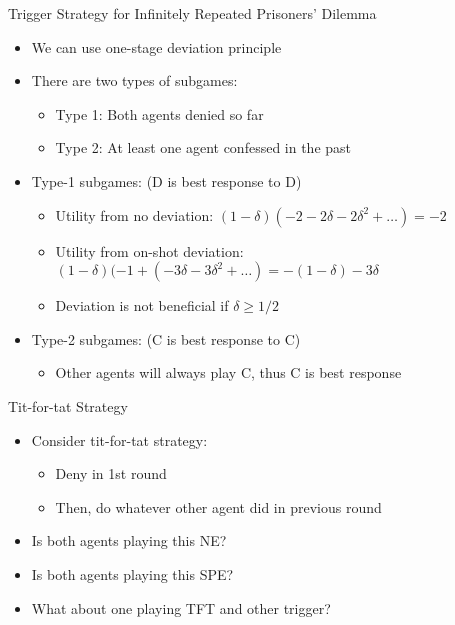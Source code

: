 \documentclass[11pt,aspectratio=169]{beamer}
\begin{document}
  
  \begin{frame}{Trigger Strategy for Infinitely Repeated Prisoners' Dilemma}
   \begin{itemize}[<+->]
   \setlength{\itemsep}{0.7em}
    \item We can use one-stage deviation principle
    \item There are two types of subgames:
    \begin{itemize}[<.->]
     \item Type 1: Both agents denied so far
     \item Type 2: At least one agent confessed in the past
    \end{itemize}
    \item Type-1 subgames: (D is best response to D)
    \begin{itemize}
     \item Utility from no deviation: $(1 - \delta) (-2 - 2\delta - 2\delta^{2} + \dots) = - 2$
     \item Utility from on-shot deviation: $(1 - \delta) (-1 + (-3\delta -3\delta^{2} + \dots) = - (1 - \delta ) - 3\delta$
     \item Deviation is not beneficial if $\delta  \geq  1/2$
    \end{itemize}
    \item Type-2 subgames: (C is best response to C)
    \begin{itemize}
     \item Other agents will always play C, thus C is best response
    \end{itemize}  
   \end{itemize}
  \end{frame}    
    
  \begin{frame}{Tit-for-tat Strategy}
   \begin{itemize}[<+->]
   \setlength{\itemsep}{1.2em}
    \item Consider \alert{tit-for-tat} strategy:
    \begin{itemize}[<.->]
     \item Deny in 1st round
     \item Then, do whatever other agent did in previous round
    \end{itemize}
    \item Is both agents playing this NE?
    \item Is both agents playing this SPE?
    \item What about one playing TFT and other trigger?
   \end{itemize}
  \end{frame}
  
\end{document}
